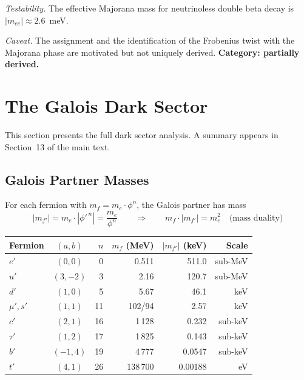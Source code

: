 \documentclass[12pt,a4paper]{article}
\theoremstyle{definition}
\begin{document}
\textit{Testability.}  The effective Majorana mass for neutrinoless double beta decay is $|m_{ee}| \approx 2.6$~meV.

\textit{Caveat.}  The assignment and the identification of the Frobenius twist with the Majorana phase are motivated but not uniquely derived.  \textbf{Category: partially derived.}


\section{The Galois Dark Sector}
\label{sec:S-dark}

This section presents the full dark sector analysis.  A summary appears in Section~13 of the main text.

\subsection{Galois Partner Masses}

For each fermion with $m_f = m_e \cdot \phi^n$, the Galois partner has mass
\begin{equation}
|m_{f'}| = m_e \cdot |\phi'^{\,n}| = \frac{m_e}{\phi^n} \qquad \Longrightarrow \qquad m_f \cdot |m_{f'}| = m_e^2 \quad \text{(mass duality)}
\end{equation}

\begin{center}
\begin{tabular}{lcrrrr}
\toprule
\textbf{Fermion} & $(a,b)$ & $n$ & $m_f$ (MeV) & $|m_{f'}|$ (keV) & \textbf{Scale} \\
\midrule
$e'$   & $(0,0)$   & 0  & 0.511        & 511.0   & sub-MeV \\
$u'$   & $(3,-2)$  & 3  & 2.16         & 120.7   & sub-MeV \\
$d'$   & $(1,0)$   & 5  & 5.67         & 46.1    & keV \\
$\mu', s'$ & $(1,1)$ & 11 & 102/94    & 2.57    & keV \\
$c'$   & $(2,1)$   & 16 & 1\,128       & 0.232   & sub-keV \\
$\tau'$ & $(1,2)$  & 17 & 1\,825       & 0.143   & sub-keV \\
$b'$   & $(-1,4)$  & 19 & 4\,777       & 0.0547  & sub-keV \\
$t'$   & $(4,1)$   & 26 & 138\,700     & 0.00188 & eV \\
\bottomrule
\end{tabular}
\end{center}
\end{document}
